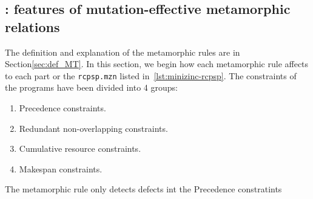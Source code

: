 \subsection{\rqidentifying: features of mutation-effective metamorphic relations}
The definition and explanation of the metamorphic rules are in
Section\ref{sec:def_MT}. In this section, we begin how each
metamorphic rule affects to each part or the \lstinline|rcpsp.mzn|
listed in~\ref{lst:minizinc-rcpsp}. The constraints of the programs
have been divided into 4 groups:
\begin{enumerate}
\item\label{item:precdence} Precedence constraints.
\item\label{item:redundant} Redundant non-overlapping constraints.
\item\label{item:cumulative} Cumulative resource constraints.
\item\label{item:makespan} Makespan constraints.
\end{enumerate}
The metamorphic rule  only detects defects int the Precedence constratints


